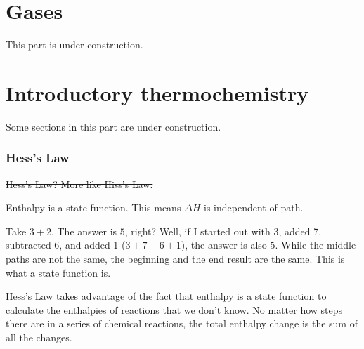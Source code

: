 \documentclass[letterpaper, 12pt]{article}
\begin{document}





\clearpage

\part{Gases}
This part is under construction.


\clearpage

\part{Introductory thermochemistry}

Some sections in this part are under construction.

\section{Hess's Law}
\st{Hess's Law? More like Hiss's Law.}

Enthalpy is a state function. This means $\Delta H$ is independent of path.

Take $3 + 2$. The answer is $5$, right? Well, if I started out with 3, added 7, subtracted 6, and added 1 ($3 + 7 - 6 + 1$), the answer is also $5$. While the middle paths are not the same, the beginning and the end result are the same. This is what a state function is.

Hess's Law takes advantage of the fact that enthalpy is a state function to calculate the enthalpies of reactions that we don't know. No matter how steps there are in a series of chemical reactions, the total enthalpy change is the sum of all the changes.
\end{document}

